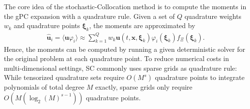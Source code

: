 The core idea of the stochastic-Collocation method is to compute the moments in the gPC expansion with a quadrature rule. Given a set of $Q$ quadrature weights $w_k$ and quadrature points $\bm{\xi}_k$, the moments are approximated by
\begin{align*}
\bm{\hat u}_i = \langle \bm{u}\varphi_i \rangle \approx \sum_{k = 1}^{Q}w_k \bm{u}({t,\bm{x},\bm{\xi}_k})\varphi_i(\bm{\xi}_k)f_{\Xi}(\bm{\xi}_k).
\end{align*} 
Hence, the moments can be computed by running a given deterministic solver for the original problem at each quadrature point. To reduce numerical costs in multi-dimensional settings, SC commonly uses sparse grids as quadrature rule: While tensorized quadrature sets require $O(M^s)$ quadrature points to integrate polynomials of total degree $M$ exactly, sparse grids only require $O(M(\log_2(M)^{s-1}))$ quadrature points. 

